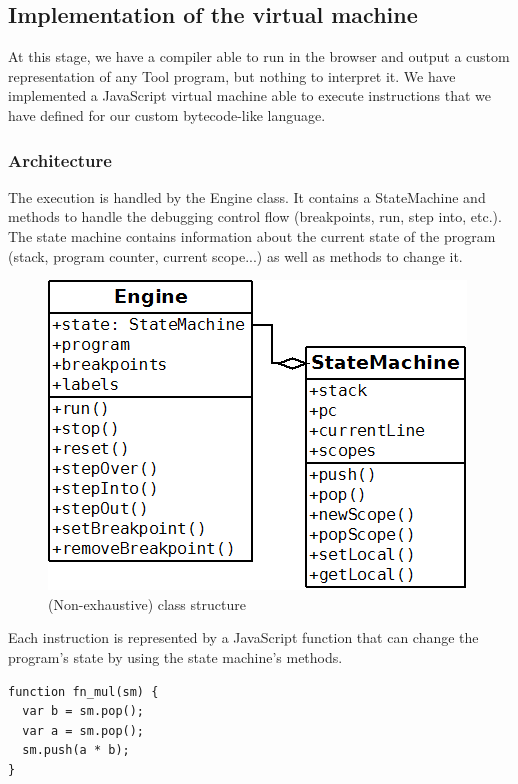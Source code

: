 \subsection{Implementation of the virtual machine}

At this stage, we have a compiler able to run in the browser and output a custom representation of any Tool program, but nothing to interpret it.
We have implemented a JavaScript virtual machine able to execute instructions that we have defined for our custom bytecode-like language.

\subsubsection{Architecture}

The execution is handled by the Engine class. It contains a StateMachine and methods to handle the debugging control flow (breakpoints, run, step into, etc.).
The state machine contains information about the current state of the program (stack, program counter, current scope...) as well as methods to change it.\\

\begin{figure}[h]
  \centering
    \includegraphics[scale=0.6]{diag.png}
     \caption{(Non-exhaustive) class structure}
\end{figure}

Each instruction is represented by a JavaScript function that can change the program's state by using the state machine's methods.

\begin{lstlisting}[caption=Example implementation the multiplication instruction]
function fn_mul(sm) {
  var b = sm.pop();
  var a = sm.pop();
  sm.push(a * b);
}
\end{lstlisting}

